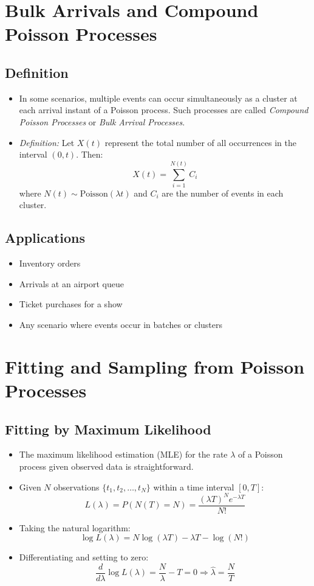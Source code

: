 \documentclass[12pt]{article}
\begin{document}
\section{Bulk Arrivals and Compound Poisson Processes}

\subsection{Definition}
\begin{itemize}
    \item In some scenarios, multiple events can occur simultaneously as a cluster at each arrival instant of a Poisson process. Such processes are called \textit{Compound Poisson Processes} or \textit{Bulk Arrival Processes}.
    \item \textit{Definition:} Let \( X(t) \) represent the total number of all occurrences in the interval \( (0, t) \). Then:
    \[
    X(t) = \sum_{i=1}^{N(t)} C_i
    \]
    where \( N(t) \sim \text{Poisson}(\lambda t) \) and \( C_i \) are the number of events in each cluster.
\end{itemize}

\subsection{Applications}
\begin{itemize}
    \item Inventory orders
    \item Arrivals at an airport queue
    \item Ticket purchases for a show
    \item Any scenario where events occur in batches or clusters
\end{itemize}

\section{Fitting and Sampling from Poisson Processes}

\subsection{Fitting by Maximum Likelihood}
\begin{itemize}
    \item The maximum likelihood estimation (MLE) for the rate \( \lambda \) of a Poisson process given observed data is straightforward.
    \item Given \( N \) observations \( \{ t_1, t_2, \ldots, t_N \} \) within a time interval \( [0, T] \):
    \[
    L(\lambda) = P(N(T) = N) = \frac{(\lambda T)^N e^{-\lambda T}}{N!}
    \]
    \item Taking the natural logarithm:
    \[
    \log L(\lambda) = N \log(\lambda T) - \lambda T - \log(N!)
    \]
    \item Differentiating and setting to zero:
    \[
    \frac{d}{d\lambda} \log L(\lambda) = \frac{N}{\lambda} - T = 0 \Rightarrow \hat{\lambda} = \frac{N}{T}
    \]
\end{itemize}
\end{document}
